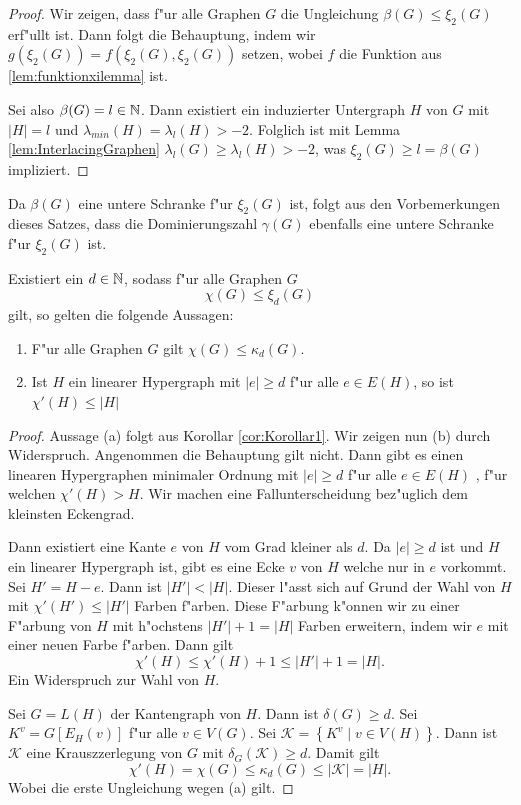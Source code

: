   \begin{proof}
    Wir zeigen, dass f"ur alle Graphen $G$ die Ungleichung $\beta(G) \leq \xi_{2}(G) $ erf"ullt ist. Dann folgt die Behauptung, indem wir $g(\xi_2(G))=f(\xi_2(G),\xi_2(G))$ setzen, wobei $f$ die Funktion aus \ref{lem:funktionxilemma} ist.

    Sei also $\beta(G) = l \in {\mathbb{N}}$. Dann existiert ein induzierter Untergraph $H$ von $G$ mit $|H| = l$ und $\lambda_{min}(H) = \lambda_{l}(H) > -2$. Folglich ist mit Lemma \ref{lem:InterlacingGraphen} $\lambda_l (G) \geq \lambda_{l}(H) > -2$, was $\xi_2(G) \geq l = \beta(G)$ impliziert.
  \end{proof}
  Da $\beta(G)$ eine untere Schranke f"ur $\xi_{2}(G)$ ist, folgt aus den Vorbemerkungen dieses Satzes, dass die Dominierungszahl $\gamma(G)$ ebenfalls eine untere Schranke f"ur $\xi_{2}(G)$ ist. 
  \begin{theorem}
    \label{thm:MainTheorem}
    Existiert ein $d\in {\mathbb{N}}$, sodass f"ur alle  Graphen $G$ $$\chi(G) \leq \xi_{d}(G)$$ gilt, so gelten die folgende Aussagen:
    \begin{enumerate}[label=\rm{(\alph*)}]
      \item F"ur alle Graphen $G$ gilt $\chi(G) \leq \kappa_d (G)$.
      \item  Ist $H$ ein linearer Hypergraph mit $\left|e\right| \geq d$ f"ur alle $e\in E(H)$, so ist $\chi'\left( H \right)\leq \left|H\right| $
    \end{enumerate}
  \end{theorem}

  \begin{proof}
    Aussage (a) folgt aus Korollar \ref{cor:Korollar1}.  
    Wir zeigen nun (b) durch Widerspruch. Angenommen die Behauptung gilt nicht. Dann gibt es einen linearen Hypergraphen minimaler Ordnung mit $|e| \geq d$ f"ur alle $e\in E(H)$ , f"ur welchen $\chi'(H) > H$. 
    Wir machen eine Fallunterscheidung bez"uglich dem kleinsten Eckengrad.

     Dann existiert eine Kante $e$ von $H$ vom Grad kleiner als $d$. Da $|e| \geq d$ ist und $H$ ein linearer Hypergraph ist, gibt es eine Ecke $v$ von $H$ welche nur in $e$ vorkommt. Sei $H'= H-e$. Dann ist $|H'| < |H|$. Dieser l"asst sich auf Grund der Wahl von $H$ mit $\chi'(H') \leq |H'|$ Farben f"arben. Diese F"arbung k"onnen wir zu einer F"arbung von $H$ mit h"ochstens $|H'|+1 = |H|$ Farben erweitern, indem wir $e$ mit einer neuen Farbe f"arben. Dann gilt 
    $$\chi'(H) \leq \chi'(H) +1  \leq |H'| +1 = |H| .$$ 
    Ein Widerspruch zur Wahl von $H$. 

     Sei $G=L(H)$ der Kantengraph von $H$. Dann ist $\delta(G) \geq d$. 
    Sei $K^{v} = G[E_{H}(v)]$ f"ur alle $v\in V(G)$. Sei $\mathcal{K}=\left\{ K^{v} \;|\; v \in V(H) \right\}$. 
    Dann ist $\mathcal{K}$ eine Krauszzerlegung von $G$ mit $\delta_{G}(\mathcal{K}) \geq d$. Damit gilt
    \begin{equation*}
      \chi'(H) = \chi(G) \leq \kappa_{d}(G) \leq |\mathcal{K}| = |H|.
    \end{equation*}
    Wobei die erste Ungleichung wegen (a) gilt. 
  \end{proof}

